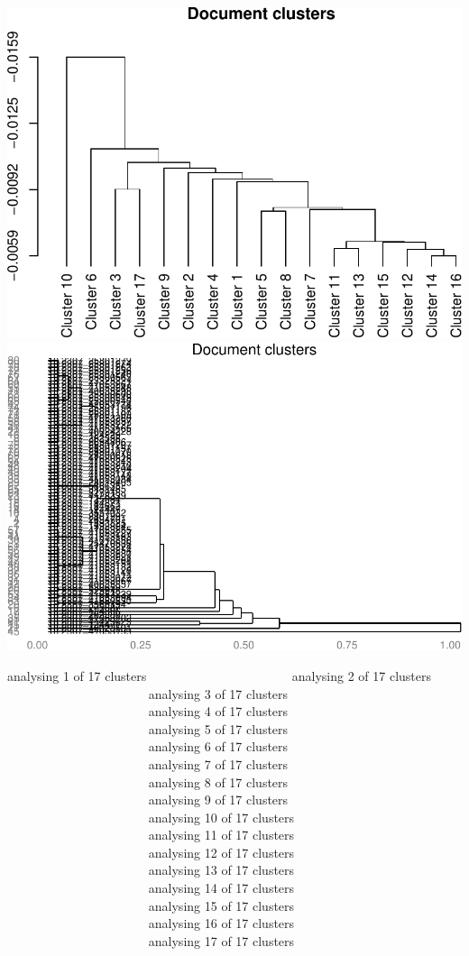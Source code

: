 \documentclass[10pt]{article}
\newenvironment{CodeChunk}{}{}
\begin{document}
\begin{CodeChunk}
\begin{CodeChunk}
\includegraphics{509Assignment_files/figure-latex/onegram3-8} 
\includegraphics{509Assignment_files/figure-latex/onegram3-9} \begin{CodeOutput}
analysing 1 of 17 clusters
analysing 2 of 17 clusters
analysing 3 of 17 clusters
analysing 4 of 17 clusters
analysing 5 of 17 clusters
analysing 6 of 17 clusters
analysing 7 of 17 clusters
analysing 8 of 17 clusters
analysing 9 of 17 clusters
analysing 10 of 17 clusters
analysing 11 of 17 clusters
analysing 12 of 17 clusters
analysing 13 of 17 clusters
analysing 14 of 17 clusters
analysing 15 of 17 clusters
analysing 16 of 17 clusters
analysing 17 of 17 clusters

\end{CodeOutput}


\end{CodeChunk}
\end{CodeChunk}
\end{document}
